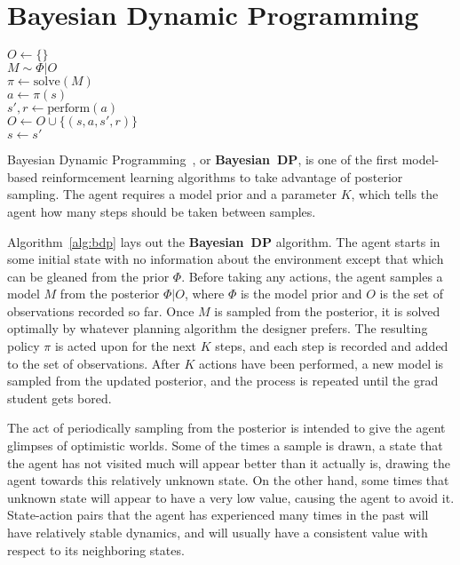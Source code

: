 \section{Bayesian Dynamic Programming}

\begin{algorithm}[tb]
	\caption{$\mbox{Bayesian~DP}(s, \Phi, K)$}
	\label{alg:bdp}
	$O \leftarrow \{\}$\\
	 {
		$M \sim \Phi|O$\\
		$\pi \leftarrow \mbox{solve}(M)$\\
		 {
			$a \leftarrow \pi(s)$\\
			$s', r \leftarrow \mbox{perform}(a)$\\
			$O \leftarrow O \cup \{(s, a, s', r)\} $\\
			$s \leftarrow s'$
		}
	}
\end{algorithm}

Bayesian Dynamic Programming~\cite{strens00}, or {\bf Bayesian~DP}, is one of the first model-based reinformcement learning algorithms to take advantage of posterior sampling. The agent requires a model prior and a parameter $K$, which tells the agent how many steps should be taken between samples.

Algorithm~\ref{alg:bdp} lays out the {\bf Bayesian~DP} algorithm. The agent starts in some initial state with no information about the environment except that which can be gleaned from the prior $\Phi$. Before taking any actions, the agent samples a model $M$ from the posterior $\Phi|O$, where $\Phi$ is the model prior and $O$ is the set of observations recorded so far. Once $M$ is sampled from the posterior, it is solved optimally by whatever planning algorithm the designer prefers. The resulting policy $\pi$ is acted upon for the next $K$ steps, and each step is recorded and added to the set of observations. After $K$ actions have been performed, a new model is sampled from the updated posterior, and the process is repeated until the grad student gets bored.

The act of periodically sampling from the posterior is intended to give the agent glimpses of optimistic worlds. Some of the times a sample is drawn, a state that the agent has not visited much will appear better than it actually is, drawing the agent towards this relatively unknown state. On the other hand, some times that unknown state will appear to have a very low value, causing the agent to avoid it. State-action pairs that the agent has experienced many times in the past will have relatively stable dynamics, and will usually have a consistent value with respect to its neighboring states.

